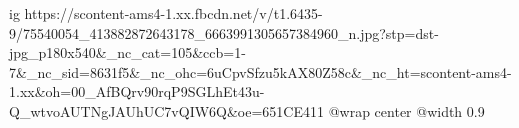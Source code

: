  
 
 
 
 

\ifcmt
  ig https://scontent-ams4-1.xx.fbcdn.net/v/t1.6435-9/75540054_413882872643178_6663991305657384960_n.jpg?stp=dst-jpg_p180x540&_nc_cat=105&ccb=1-7&_nc_sid=8631f5&_nc_ohc=6uCpvSfzu5kAX80Z58c&_nc_ht=scontent-ams4-1.xx&oh=00_AfBQrv90rqP9SGLhEt43u-Q_wtvoAUTNgJAUhUC7vQIW6Q&oe=651CE411
  @wrap center
  @width 0.9
\fi
